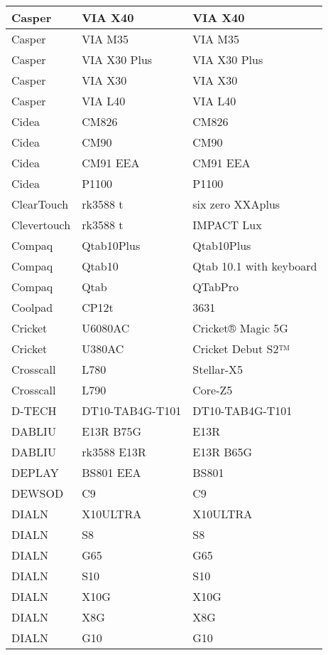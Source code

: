 \begin{tabularx}{\linewidth}{|l|X|X|}
        Casper & VIA X40 & VIA X40 \\ \hline
        Casper & VIA M35 & VIA M35 \\ \hline
        Casper & VIA X30 Plus & VIA X30 Plus \\ \hline
        Casper & VIA X30 & VIA X30 \\ \hline
        Casper & VIA L40 & VIA L40 \\ \hline
        Cidea & CM826 & CM826 \\ \hline
        Cidea & CM90 & CM90 \\ \hline
        Cidea & CM91 EEA & CM91 EEA \\ \hline
        Cidea & P1100 & P1100 \\ \hline
        ClearTouch & rk3588 t & six zero XXAplus \\ \hline
        Clevertouch & rk3588 t & IMPACT Lux \\ \hline
        Compaq & Qtab10Plus & Qtab10Plus \\ \hline
        Compaq & Qtab10 & Qtab 10.1 with keyboard \\ \hline
        Compaq & Qtab & QTabPro \\ \hline
        Coolpad & CP12t & 3631 \\ \hline
        Cricket & U6080AC & Cricket® Magic 5G \\ \hline
        Cricket & U380AC & Cricket Debut S2™ \\ \hline
        Crosscall & L780 & Stellar-X5 \\ \hline
        Crosscall & L790 & Core-Z5 \\ \hline
        D-TECH & DT10-TAB4G-T101 & DT10-TAB4G-T101 \\ \hline
        DABLIU & E13R B75G & E13R \\ \hline
        DABLIU & rk3588 E13R & E13R B65G \\ \hline
        DEPLAY & BS801 EEA & BS801 \\ \hline
        DEWSOD & C9 & C9 \\ \hline
        DIALN & X10ULTRA & X10ULTRA \\ \hline
        DIALN & S8 & S8 \\ \hline
        DIALN & G65 & G65 \\ \hline
        DIALN & S10 & S10 \\ \hline
        DIALN & X10G & X10G \\ \hline
        DIALN & X8G & X8G \\ \hline
        DIALN & G10 & G10 \\ \hline

\end{tabularx}
